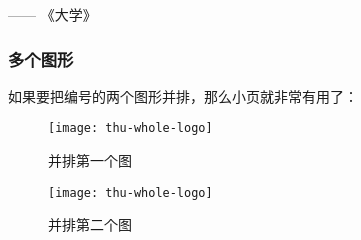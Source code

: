 \hfill —— 《大学》


\subsubsection{多个图形}
\label{sec:multifig}



如果要把编号的两个图形并排，那么小页就非常有用了：
\begin{figure}
\begin{minipage}{0.48\textwidth}
  \centering
  \texttt{[image: thu-whole-logo]}
  \caption{并排第一个图}
  \label{fig:parallel1}
\end{minipage}\hfill
\begin{minipage}{0.48\textwidth}
  \centering
  \texttt{[image: thu-whole-logo]}
  \caption{并排第二个图}
  \label{fig:parallel2}
\end{minipage}
\end{figure}

